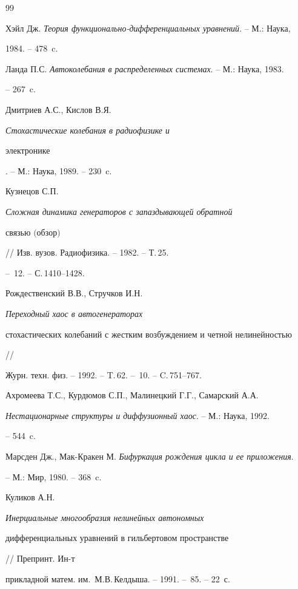 \begin{thebibliography}{99}







Хэйл Дж. {\em Теория функционально-дифференциальных уравнений}. -- М.: Наука,


1984. -- 478~c.




Ланда П.С. {\em Автоколебания в распределенных системах}. -- М.: Наука, 1983.


-- 267~c.




Дмитриев А.С., Кислов В.Я. {\em Стохастические колебания в радиофизике и


электронике}. -- М.: Наука, 1989. -- 230~c.




Кузнецов С.П. {\em Сложная динамика генераторов с запаздывающей обратной


связью $($обзор$)$} // Изв. вузов. Радиофизика. -- 1982. -- Т.\,25.


-- \No\,12. -- С.\,1410--1428.




Рождественский В.В., Стручков И.Н. {\em Переходный хаос в автогенераторах


стохастических колебаний с жестким возбуждением и четной нелинейностью} //


Журн. техн. физ. -- 1992. -- T.\,62. -- \No\,10. -- C.\,751--767.




Ахромеева Т.С., Курдюмов С.П., Малинецкий Г.Г., Самарский А.А.


{\em Нестационарные структуры и диффузионный хаос}. -- М.: Наука, 1992.


-- 544~c.




Марсден Дж., Мак-Кракен М. {\em Бифуркация рождения цикла и ее приложения}.


-- М.: Мир, 1980. -- 368~c.




Куликов А.Н. {\em Инерциальные многообразия нелинейных автономных


дифференциальных уравнений в гильбертовом пространстве} // Препринт. Ин-т


прикладной матем. им.~М.В.\,Келдыша. -- 1991. -- \No\,85. -- 22~с.



\end{thebibliography}
